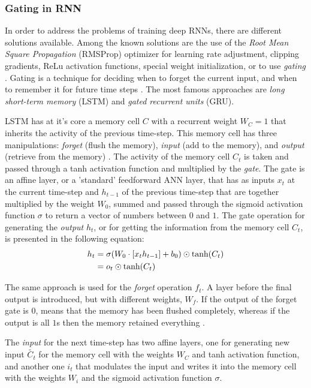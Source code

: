 \subsubsection{Gating in RNN}
In order to address the problems of training deep RNNs, there are different solutions available. Among the known solutions are the use of the \textit{Root Mean Square Propagation} (RMSProp) optimizer for learning rate adjustment, clipping gradients, ReLu activation functions, special weight initialization, or to use \textit{gating} \cite{NeonRNN}. Gating is a technique for deciding when to forget the current input, and when to remember it for future time steps \cite{RNNvideo}. The most famous approaches are \textit{long short-term memory} (LSTM) and \textit{gated recurrent units} (GRU).

LSTM has at it's core a memory cell $C$ with a recurrent weight $W_{C}=1$ that inherits the activity of the previous time-step. This memory cell has three manipulations: \textit{forget} (flush the memory), \textit{input} (add to the memory), and \textit{output} (retrieve from the memory) \cite{NeonRNN}. The activity of the memory cell $C_{t}$ is taken and passed through a tanh activation function and multiplied by the \textit{gate}. The gate is an affine layer, or a 'standard' feedforward ANN layer, that has as inputs $x_{t}$ at the current time-step and $h_{t-1}$ of the previous time-step that are together multiplied by the weight $W_{0}$, summed and passed through the sigmoid activation function $\sigma$ to return a vector of numbers between $0$ and $1$. The gate operation for generating the \textit{output} $h_{t}$, or for getting the information from the memory cell $C_{t}$, is presented in the following equation:
\begin{equation}\label{gate}
\begin{split}
h_{t}&=\sigma(W_{0}\cdot \left [ x_{t} h_{t-1} \right ]+b_{0})\odot \textup{tanh}(C_{t})\\
&=o_{t}\odot \textup{tanh}(C_{t})
\end{split}
\end{equation}

The same approach is used for the \textit{forget} operation $f_{t}$. A layer before the final output is introduced, but with different weights, $W_{f}$. If the output of the forget gate is $0$, means that the memory has been flushed completely, whereas if the output is all $1$s then the memory retained everything \cite{NeonRNN}. 

The \textit{input} for the next time-step has two affine layers, one for generating new input $\widetilde{C_{t}}$ for the memory cell with the weights $W_{C}$ and tanh activation function, and another one $i_{t}$ that modulates the input and writes it into the memory cell with the weights $W_{i}$ and the sigmoid activation function $\sigma$. 

